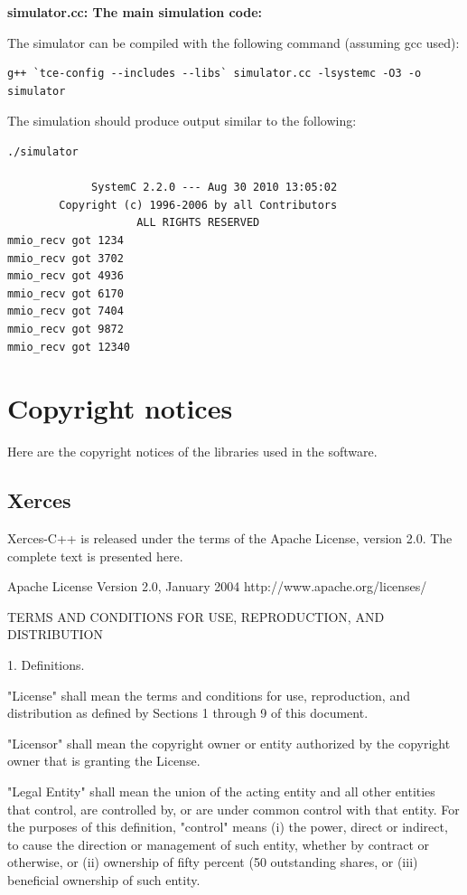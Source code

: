 \documentclass[twoside]{tceusermanual}
\begin{document}
\textbf{simulator.cc: The main simulation code:}
 


The simulator can be compiled with the following command (assuming gcc
used):

\begin{verbatim}
g++ `tce-config --includes --libs` simulator.cc -lsystemc -O3 -o simulator
\end{verbatim}

The simulation should produce output similar to the following:

\begin{verbatim}
./simulator

             SystemC 2.2.0 --- Aug 30 2010 13:05:02
        Copyright (c) 1996-2006 by all Contributors
                    ALL RIGHTS RESERVED
mmio_recv got 1234
mmio_recv got 3702
mmio_recv got 4936
mmio_recv got 6170
mmio_recv got 7404
mmio_recv got 9872
mmio_recv got 12340
\end{verbatim}


\chapter{Copyright notices}

Here are the copyright notices of the libraries used in the software.

\section{Xerces}

Xerces-C++ is released under the terms of the Apache License, version
2.0.  The complete text is presented here.


                                 Apache License
                           Version 2.0, January 2004
                        http://www.apache.org/licenses/

   TERMS AND CONDITIONS FOR USE, REPRODUCTION, AND DISTRIBUTION

   1. Definitions.

      "License" shall mean the terms and conditions for use, reproduction,
      and distribution as defined by Sections 1 through 9 of this document.

      "Licensor" shall mean the copyright owner or entity authorized by
      the copyright owner that is granting the License.

      "Legal Entity" shall mean the union of the acting entity and all
      other entities that control, are controlled by, or are under common
      control with that entity. For the purposes of this definition,
      "control" means (i) the power, direct or indirect, to cause the
      direction or management of such entity, whether by contract or
      otherwise, or (ii) ownership of fifty percent (50%
      outstanding shares, or (iii) beneficial ownership of such entity.
\end{document}
